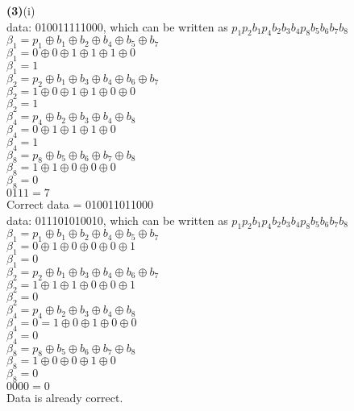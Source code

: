 \documentclass[a4paper, 11pt]{article}
\renewcommand{\part}[1] {\vspace{.10in} {\bf (#1)}}
\begin{document}
\part{3}{(i)}\\
data: 010011111000, which can be written as $p_1 p_2 b_1 p_4 b_2 b_3 b_4 p_8 b_5 b_6 b_7 b_8$\\
$\beta_1 = p_1 \oplus b_1 \oplus b_2 \oplus b_4 \oplus b_5 \oplus b_7$\\
$\beta_1 = 0 \oplus 0 \oplus 1 \oplus 1 \oplus 1 \oplus 0$\\
$\beta_1 = 1$\\
$\beta_2 = p_2 \oplus b_1 \oplus b_3 \oplus b_4 \oplus b_6 \oplus b_7$\\
$\beta_2 = 1 \oplus 0 \oplus 1 \oplus 1 \oplus 0 \oplus 0$\\
$\beta_2 = 1$\\
$\beta_4 = p_4 \oplus b_2 \oplus b_3 \oplus b_4 \oplus b_8$\\
$\beta_4 = 0 \oplus 1 \oplus 1 \oplus 1 \oplus 0$\\
$\beta_4 = 1$\\
$\beta_8 = p_8 \oplus b_5 \oplus b_6 \oplus b_7 \oplus b_8$\\
$\beta_8 = 1 \oplus 1 \oplus 0 \oplus 0 \oplus 0$\\
$\beta_8 = 0$\\
$0111 = 7$\\
Correct data = 010011011000\\
data: 011101010010, which can be written as $p_1 p_2 b_1 p_4 b_2 b_3 b_4 p_8 b_5 b_6 b_7 b_8$\\
$\beta_1 = p_1 \oplus b_1 \oplus b_2 \oplus b_4 \oplus b_5 \oplus b_7$\\
$\beta_1 = 0 \oplus 1 \oplus 0 \oplus 0 \oplus 0 \oplus 1$\\
$\beta_1 = 0$\\
$\beta_2 = p_2 \oplus b_1 \oplus b_3 \oplus b_4 \oplus b_6 \oplus b_7$\\
$\beta_2 = 1 \oplus 1 \oplus 1 \oplus 0 \oplus 0 \oplus 1$\\
$\beta_2 = 0$\\
$\beta_4 = p_4 \oplus b_2 \oplus b_3 \oplus b_4 \oplus b_8$\\
$\beta_4 = 0 = 1 \oplus 0 \oplus 1 \oplus 0 \oplus 0$\\
$\beta_4 = 0$\\
$\beta_8 = p_8 \oplus b_5 \oplus b_6 \oplus b_7 \oplus b_8$\\
$\beta_8 = 1 \oplus 0 \oplus 0 \oplus 1 \oplus 0$\\
$\beta_8 = 0$\\
$0000 = 0$\\
Data is already correct.
\end{document}
